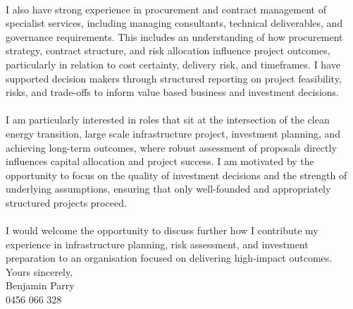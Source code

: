 {	\\
	I also have strong experience in procurement and contract management of specialist services, including managing consultants, technical deliverables, and governance requirements. This includes an understanding of how procurement strategy, contract structure, and risk allocation influence project outcomes, particularly in relation to cost certainty, delivery risk, and timeframes. I have supported decision makers through structured reporting on project feasibility, risks, and trade-offs to inform value based business and investment decisions.\\
	\\
	I am particularly interested in roles that sit at the intersection of the clean energy transition, large scale infrastructure project, investment planning, and achieving long-term outcomes, where robust assessment of proposals directly influences capital allocation and project success. I am motivated by the opportunity to focus on the quality of investment decisions and the strength of underlying assumptions, ensuring that only well-founded and appropriately structured projects proceed.\\
	\\
	I would welcome the opportunity to discuss further how I contribute my experience in infrastructure planning, risk assessment, and investment preparation to an organisation focused on delivering high-impact outcomes.\\
	
	Yours sincerely,\\
	
	Benjamin Parry\\
	0456 066 328}


